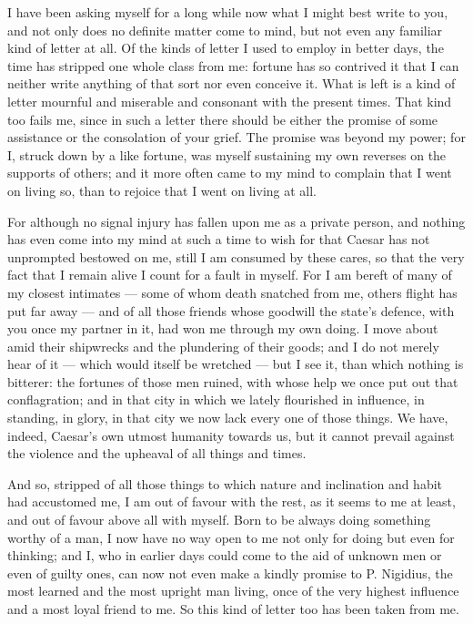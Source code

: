 

 I have been asking myself for a long while now what I might best write to you, and not only does no definite matter come to mind, but not even any familiar kind of letter at all. Of the kinds of letter I used to employ in better days, the time has stripped one whole class from me: fortune has so contrived it that I can neither write anything of that sort nor even conceive it. What is left is a kind of letter mournful and miserable and consonant with the present times. That kind too fails me, since in such a letter there should be either the promise of some assistance or the consolation of your grief. The promise was beyond my power; for I, struck down by a like fortune, was myself sustaining my own reverses on the supports of others; and it more often came to my mind to complain that I went on living so, than to rejoice that I went on living at all.

 For although no signal injury has fallen upon me as a private person, and nothing has even come into my mind at such a time to wish for that Caesar has not unprompted bestowed on me, still I am consumed by these cares, so that the very fact that I remain alive I count for a fault in myself. For I am bereft of many of my closest intimates --- some of whom death snatched from me, others flight has put far away --- and of all those friends whose goodwill the state's defence, with you once my partner in it, had won me through my own doing. I move about amid their shipwrecks and the plundering of their goods; and I do not merely hear of it --- which would itself be wretched --- but I see it, than which nothing is bitterer: the fortunes of those men ruined, with whose help we once put out that conflagration; and in that city in which we lately flourished in influence, in standing, in glory, in that city we now lack every one of those things. We have, indeed, Caesar's own utmost humanity towards us, but it cannot prevail against the violence and the upheaval of all things and times.

 And so, stripped of all those things to which nature and inclination and habit had accustomed me, I am out of favour with the rest, as it seems to me at least, and out of favour above all with myself. Born to be always doing something worthy of a man, I now have no way open to me not only for doing but even for thinking; and I, who in earlier days could come to the aid of unknown men or even of guilty ones, can now not even make a kindly promise to P. Nigidius, the most learned and the most upright man living, once of the very highest influence and a most loyal friend to me. So this kind of letter too has been taken from me.

